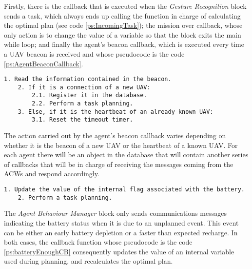 Firstly, there is the callback that is executed when the \emph{Gesture Recognition} block sends a task, which always ends up calling the function in charge of calculating the optimal plan (see code \ref{ps:IncomingTask}); the mission over callback, whose only action is to change the value of a variable so that the block exits the main while loop; and finally the agent's beacon callback, which is executed every time a \gls{UAV} beacon is received and whose pseudocode is the code \ref{ps:AgentBeaconCallback}.

\begin{lstlisting}[caption={Agent's beacon callback}, breaklines=true, label=ps:AgentBeaconCallback]
	1. Read the information contained in the beacon.
	2. If it is a connection of a new UAV:
		2.1. Register it in the database.
		2.2. Perform a task planning.
	3. Else, if it is the heartbeat of an already known UAV:
		3.1. Reset the timeout timer.
\end{lstlisting}

The action carried out by the agent's beacon callback varies depending on whether it is the beacon of a new \gls{UAV} or the heartbeat of a known \gls{UAV}. For each agent there will be an object in the database that will contain another series of callbacks that will be in charge of receiving the messages coming from the \glspl{ACW} and respond accordingly.

\begin{lstlisting}[caption={Callback that runs when an \emph{Agent Behaviour Manager} sends battery feedback}, breaklines=true, label=ps:batteryEnoughCB]
	1. Update the value of the internal flag associated with the battery.
	2. Perform a task planning.
\end{lstlisting}

The \emph{Agent Behaviour Manager} block only sends communications messages indicating the battery status when it is due to an unplanned event. This event can be either an early battery depletion or a faster than expected recharge. In both cases, the callback function whose pseudocode is the code \ref{ps:batteryEnoughCB} consequently updates the value of an internal variable used during planning, and recalculates the optimal plan.

